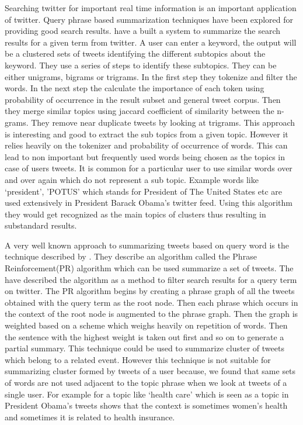 Searching twitter for important real time information is an important application of twitter. Query phrase based summarization techniques have been explored for providing good search results. \citet{DBLP:conf/icwsm/OConnorKA10} have a built a system to summarize the search results for a given term from twitter. A user can enter a keyword, the output will be a clustered sets of tweets identifying the different subtopics about the keyword. They use a series of steps to identify these subtopics. They can be either unigrams, bigrams or trigrams. In the first step they tokenize and filter the words. In the next step the calculate the importance of each token using probability of occurrence in the result subset and general tweet corpus. Then they merge similar topics using jaccard coefficient of similarity between the n-grams. They remove near duplicate tweets by looking at trigrams. This approach is interesting and good to extract the sub topics from a given topic. However it relies heavily on the tokenizer and probability of occurrence of words. This can lead to non important but frequently used words being chosen as the topics in case of users tweets. It is common for a particular user to use similar words over and over again which do not represent a sub topic. Example words like ‘president’, ’POTUS’ which stands for President of The United States etc are used extensively in President Barack Obama’s twitter feed. Using this algorithm they would get recognized as the main topics of clusters thus resulting in substandard results. 

A very well known approach to summarizing tweets based on query word is the technique described by \citet{Sharifi:2010:SMA:1857999.1858099}. They describe an algorithm called the Phrase Reinforcement(PR) algorithm which can be used summarize a set of tweets. The have described the algorithm as a method to filter search results for a query term on twitter. The PR algorithm begins by creating a phrase graph of all the tweets obtained with the query term as the root node. Then each phrase which occurs in the context of the root node is augmented to the phrase graph. Then the graph is weighted based on a scheme which weighs heavily on repetition of words. Then the sentence with the highest weight is taken out first and so on to generate a partial summary.  This technique could be used to summarize cluster of tweets which belong to a related event. However this technique is not suitable for summarizing cluster formed by tweets of a user because, we  found that same sets of words are not used adjacent to the topic phrase when we look at tweets of a single user. For example for a  topic like ‘health care’ which is seen as a topic in President Obama’s tweets shows that the context is sometimes women’s health and sometimes it is related to health insurance.

